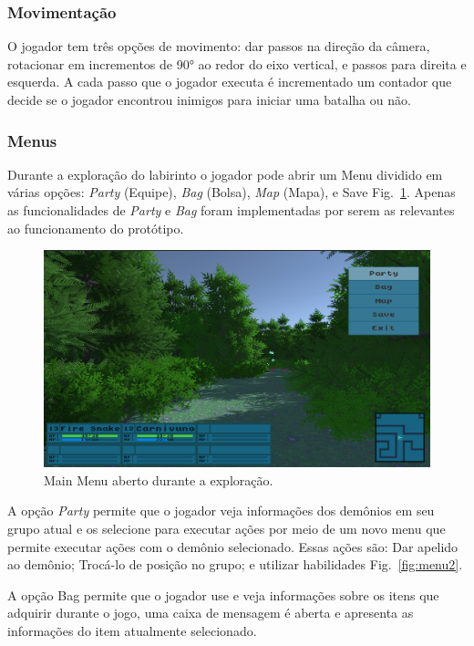 \documentclass[
	12pt,				%
	openright,			%
	twoside,			%
	a4paper,			%
	english,			%
	french,				%
	spanish,			%
	brazil				%
	]{abntex2}
\begin{document}
\subsubsection{Movimentação}

O jogador tem três opções de movimento: dar passos na direção da câmera, rotacionar em incrementos de 90° ao redor do eixo vertical, e passos para direita e esquerda.
A cada passo que o jogador executa é incrementado um contador que decide se o jogador encontrou inimigos para iniciar uma batalha ou não.

\subsubsection{Menus}\label{owmenu}

Durante a exploração do labirinto o jogador pode abrir um Menu dividido em várias opções: \emph{Party} (Equipe), \emph{Bag} (Bolsa), \emph{Map} (Mapa), e Save Fig.~\ref{fig:menu1}. Apenas as funcionalidades de \emph{Party} e \emph{Bag} foram implementadas por serem as relevantes ao funcionamento do protótipo.

\begin{figure}[h!]
  \includegraphics[width=\linewidth]{mainmenu.jpg}
  \caption{Main Menu aberto durante a exploração.}
  \label{fig:menu1}
\end{figure}

A opção \emph{Party} permite que o jogador veja informações dos demônios em seu grupo atual e os selecione para executar ações por meio de um novo menu que permite executar ações com o demônio selecionado. Essas ações são: Dar apelido ao demônio; Trocá-lo de posição no grupo; e utilizar habilidades Fig.~\ref{fig:menu2}.

A opção Bag permite que o jogador use e veja informações sobre os itens que adquirir durante o jogo, uma caixa de mensagem é aberta e apresenta as informações do item atualmente selecionado.
\end{document}
